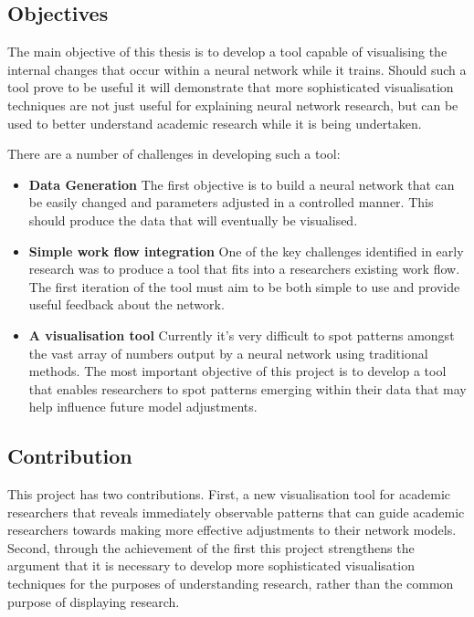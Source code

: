 \documentclass[a4paper,11pt,titlepage]{article}
\begin{document}
	\subsection{Objectives}
	The main objective of this thesis is to develop a tool capable of visualising the internal changes that occur within a neural network while it trains. Should such a tool prove to be useful it will demonstrate that more sophisticated visualisation techniques are not just useful for explaining neural network research, but can be used to better understand academic research while it is being undertaken.
	\\	
	\par 
	There are a number of challenges in developing such a tool:
		\begin{itemize}
			\item \textbf{Data Generation} The first objective is to build a neural network that can be easily changed and parameters adjusted in a controlled manner. This should produce the data that will eventually be visualised.
			\item \textbf{Simple work flow integration} One of the key challenges identified in early research was to produce a tool that fits into a researchers existing work flow. The first iteration of the tool must aim to be both simple to use and provide useful feedback about the network. 
			\item \textbf{A visualisation tool} Currently it's very difficult to spot patterns amongst the vast array of numbers output by a neural network using traditional methods. The most important objective of this project is to develop a tool that enables researchers to spot patterns emerging within their data that may help influence future model adjustments.
		\end{itemize}

	\subsection{Contribution}
	This project has two contributions. First, a new visualisation tool for academic researchers that reveals immediately observable patterns that can guide academic researchers towards making more effective adjustments to their network models. Second, through the achievement of the first this project strengthens the argument that it is necessary to develop more sophisticated visualisation techniques for the purposes of understanding research, rather than the common purpose of displaying research.
	
\end{document}
